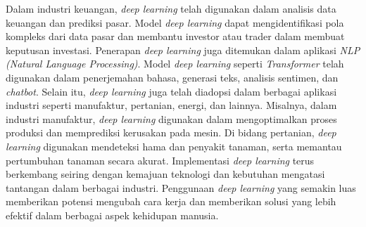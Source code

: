 Dalam industri keuangan, \textit{deep learning} telah digunakan dalam analisis data keuangan dan prediksi pasar. Model \textit{deep learning} dapat mengidentifikasi pola kompleks dari data pasar dan membantu investor atau trader dalam membuat keputusan investasi. Penerapan \textit{deep learning} juga ditemukan dalam aplikasi \textit{NLP (Natural Language Processing)}. Model \textit{deep learning} seperti \textit{Transformer} telah digunakan dalam penerjemahan bahasa, generasi teks, analisis sentimen, dan \textit{chatbot}. Selain itu, \textit{deep learning} juga telah diadopsi dalam berbagai aplikasi industri seperti manufaktur, pertanian, energi, dan lainnya. Misalnya, dalam industri manufaktur, \textit{deep learning} digunakan dalam mengoptimalkan proses produksi dan memprediksi kerusakan pada mesin. Di bidang pertanian, \textit{deep learning} digunakan mendeteksi hama dan penyakit tanaman, serta memantau pertumbuhan tanaman secara akurat. Implementasi \textit{deep learning} terus berkembang seiring dengan kemajuan teknologi dan kebutuhan mengatasi tantangan dalam berbagai industri. Penggunaan \textit{deep learning} yang semakin luas memberikan potensi mengubah cara kerja dan memberikan solusi yang lebih efektif dalam berbagai aspek kehidupan manusia.

